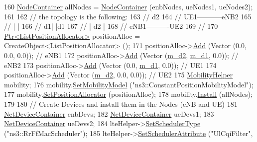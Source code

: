 \begin{DoxyCode}
160   \hyperlink{classns3_1_1NodeContainer}{NodeContainer} allNodes = \hyperlink{classns3_1_1NodeContainer}{NodeContainer} (enbNodes, ueNodes1, ueNodes2);
161 
162   \textcolor{comment}{// the topology is the following:}
163   \textcolor{comment}{//         d2}
164   \textcolor{comment}{//  UE1-----------eNB2}
165   \textcolor{comment}{//   |             |}
166   \textcolor{comment}{// d1|             |d1}
167   \textcolor{comment}{//   |     d2      |}
168   \textcolor{comment}{//  eNB1----------UE2}
169   \textcolor{comment}{//}
170   \hyperlink{classns3_1_1Ptr}{Ptr<ListPositionAllocator>} positionAlloc = CreateObject<ListPositionAllocator> 
      ();
171   positionAlloc->\hyperlink{classns3_1_1ListPositionAllocator_a460e82f015ac012a73ba0ea0cccb3486}{Add} (Vector (0.0, 0.0, 0.0));   \textcolor{comment}{// eNB1}
172   positionAlloc->\hyperlink{classns3_1_1ListPositionAllocator_a460e82f015ac012a73ba0ea0cccb3486}{Add} (Vector (\hyperlink{classLteUeMeasurementsTestCase_ad457745e25b7a52f7f9d9fa36d9c03ba}{m\_d2}, \hyperlink{classLteUeMeasurementsTestCase_a34e48f5e672722165a52dfe598fd4466}{m\_d1}, 0.0)); \textcolor{comment}{// eNB2}
173   positionAlloc->\hyperlink{classns3_1_1ListPositionAllocator_a460e82f015ac012a73ba0ea0cccb3486}{Add} (Vector (0.0, \hyperlink{classLteUeMeasurementsTestCase_a34e48f5e672722165a52dfe598fd4466}{m\_d1}, 0.0));  \textcolor{comment}{// UE1}
174   positionAlloc->\hyperlink{classns3_1_1ListPositionAllocator_a460e82f015ac012a73ba0ea0cccb3486}{Add} (Vector (\hyperlink{classLteUeMeasurementsTestCase_ad457745e25b7a52f7f9d9fa36d9c03ba}{m\_d2}, 0.0, 0.0));  \textcolor{comment}{// UE2}
175   \hyperlink{classns3_1_1MobilityHelper}{MobilityHelper} mobility;
176   mobility.\hyperlink{classns3_1_1MobilityHelper_a030275011b6f40682e70534d30280aba}{SetMobilityModel} (\textcolor{stringliteral}{"ns3::ConstantPositionMobilityModel"});
177   mobility.\hyperlink{classns3_1_1MobilityHelper_ac59d5295076be3cc11021566713a28c5}{SetPositionAllocator} (positionAlloc);
178   mobility.\hyperlink{classns3_1_1MobilityHelper_a07737960ee95c0777109cf2994dd97ae}{Install} (allNodes);
179 
180   \textcolor{comment}{// Create Devices and install them in the Nodes (eNB and UE)}
181   \hyperlink{classns3_1_1NetDeviceContainer}{NetDeviceContainer} enbDevs;
182   \hyperlink{classns3_1_1NetDeviceContainer}{NetDeviceContainer} ueDevs1;
183   \hyperlink{classns3_1_1NetDeviceContainer}{NetDeviceContainer} ueDevs2;
184   lteHelper->\hyperlink{classns3_1_1LteHelper_a8f86e55b8b80a81732c4b2df00fb25d5}{SetSchedulerType} (\textcolor{stringliteral}{"ns3::RrFfMacScheduler"});
185   lteHelper->\hyperlink{classns3_1_1LteHelper_a38f8c7f4592b31c0f3dedb53e7909742}{SetSchedulerAttribute} (\textcolor{stringliteral}{"UlCqiFilter"}, 

\end{DoxyCode}
